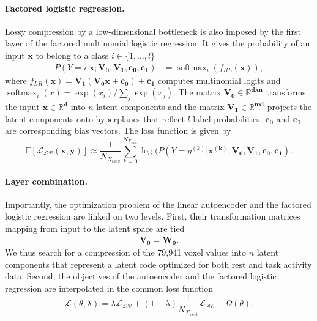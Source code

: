 \documentclass{article} %
\DeclareMathOperator{\softmax}{softmax}
\begin{document}
\paragraph{Factored logistic regression.}
Lossy compression by a low-dimensional bottleneck
is also imposed by the first layer of the factored
multinomial logistic regression.
It gives the probability of an input $\mathbf{x}$ to belong
to a class $i \in \{1, \dots, l\}$
\begin{equation}
  \begin{split}
    P(Y=i|\mathbf{x; V_0,V_1,c_0, c_1}) &= \softmax_i(f_{RL}(\mathbf x)),
  \end{split}
  \label{eq:lr}
\end{equation}
where \(f_{LR}(\mathbf x) = \mathbf{V_1 (V_0 x + c_0) + c_1}\) computes 
multinomial logits and \(\softmax_i(x) = \exp(x_i)/\sum_j\exp(x_j)\).
The matrix $\mathbf{V_0 \in \mathbb{R}^{dxn}}$
transforms the input $\mathbf{x \in \mathbb{R}^{d}}$
into $n$ latent components
and the matrix $\mathbf{V_1 \in \mathbb{R}^{nxl}}$
projects the latent components
onto hyperplanes that reflect $l$ label probabilities.
$\mathbf{c_0}$ and $\mathbf{c_1}$ are corresponding
bias vectors.
The loss function is given by
\begin{equation}
    \mathbb E\left[{\mathcal{L_{LR}}}(\mathbf{x, y})\right] \approx %
\frac{1}{N_{X_{task}}} \sum_{k=0}^{N_{X_{task}}} \log(P(Y=y^{(k)}|\mathbf{x^{(k)}; V_0, V_1, c_0, c_1}).
\label{eq:lr_loss}
\end{equation}

\paragraph{Layer combination.}
Importantly, the optimization problem of the linear autoencoder
and the factored logistic regression
are linked on two levels. First, their transformation matrices mapping from
input to the latent space are tied
\begin{eqnarray}
  \mathbf{V_0} = \mathbf{W_0}.
\end{eqnarray}
We thus search for a compression of the 79,941 voxel values into $n$ latent
components that represent a latent code optimized for both
rest and task activity data.
Second, the objectives of the autoencoder and the factored
logistic regression are interpolated in the common loss function
\begin{equation}
{\mathcal{L}}(\theta, \lambda) = \lambda {\mathcal{L_{LR}}}
+ (1-\lambda)\frac{1}{N_{X_{rest}}} {\mathcal{L_{AE}}} + \Omega(\theta).
  \label{eq:loss_equ}
\end{equation}
\end{document}
